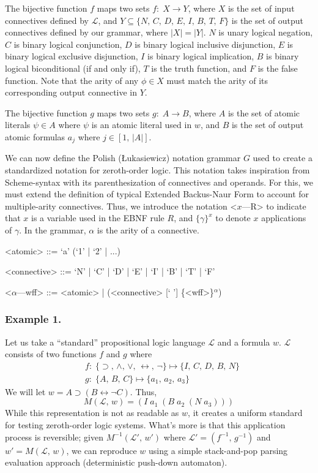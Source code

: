 \documentclass[ms]{uncgdissertationexp2}
\theoremstyle{plain}
\theoremstyle{definition}
\theoremstyle{remark}
\begin{document}
    The bijective function $f$ maps two sets $f:\;X \to Y$, where $X$ is the set of input connectives defined by $\mathcal{L}$, and $Y \subseteq \{N,\,C,\,D,\,E,\,I,\,B,\,T,\,F\}$ is the set of output connectives defined by our grammar, where $|X| = |Y|$. $N$ is unary logical negation, $C$ is binary logical conjunction, $D$ is binary logical inclusive disjunction, $E$ is binary logical exclusive disjunction, $I$ is binary logical implication, $B$ is binary logical biconditional (if and only if), $T$ is the truth function, and $F$ is the false function. Note that the arity of any $\phi \in X$ must match the arity of its corresponding output connective in $Y$.

    The bijective function $g$ maps two sets $g:\;A \to B$, where $A$ is the set of atomic literals $\psi \in A$ where $\psi$ is an atomic literal used in $w$, and $B$ is the set of output atomic formulas $a_{j}$ where $j \in [1,\,|A|]$.

    We can now define the Polish (Łukasiewicz) notation grammar $G$ used to create a standardized notation for zeroth-order logic. This notation takes inspiration from Scheme-syntax with its parenthesization of connectives and operands. For this, we must extend the definition of typical Extended Backus-Naur Form to account for multiple-arity connectives. Thus, we introduce the notation \textless{$x$---R\textgreater} to indicate that $x$ is a variable used in the EBNF rule $R$, and $\{\gamma\}^{x}$ to denote $x$ applications of $\gamma$. In the grammar, $\alpha$ is the arity of a connective.
    \begin{grammar}
        <atomic> ::= `a' (`1' | `2' | ...)
        
        <connective> ::= `N' | `C' | `D' | `E' | `I' | `B' | `T' | `F' 
        
        <$\alpha$---wff> ::= <atomic> | (<connective> [` '] \{<wff>\}$^{\alpha}$)
    \end{grammar}
    \subsubsection{Example 1.} Let us take a ``standard'' propositional logic language $\mathcal{L}$ and a formula $w$. $\mathcal{L}$ consists of two functions $f$ and $g$ where
    \begin{align*}
        &f:\;\{\supset,\,\land,\,\lor,\,\leftrightarrow,\,\lnot\}\mapsto \{I,\,C,\,D,\,B,\,N\}\\
        &g:\;\{A,\,B,\,C\} \mapsto \{a_{1},\,a_{2},\,a_{3}\}
    \end{align*}
    We will let $w = A \supset (B \leftrightarrow \lnot C)$. Thus, 
    \[
        M(\mathcal{L},\,w) = (I\;a_{1}\;(B\;a_{2}\;(N\;a_{3})))
    \]
    While this representation is not as readable as $w$, it creates a uniform standard for testing zeroth-order logic systems. What's more is that this application process is reversible; given $M^{-1}(\mathcal{L}',\,w')$ where $\mathcal{L}' = (f^{-1},\,g^{-1})$ and $w' = M(\mathcal{L},\,w)$, we can reproduce $w$ using a simple stack-and-pop parsing evaluation approach (deterministic push-down automaton).
    
\end{document}

